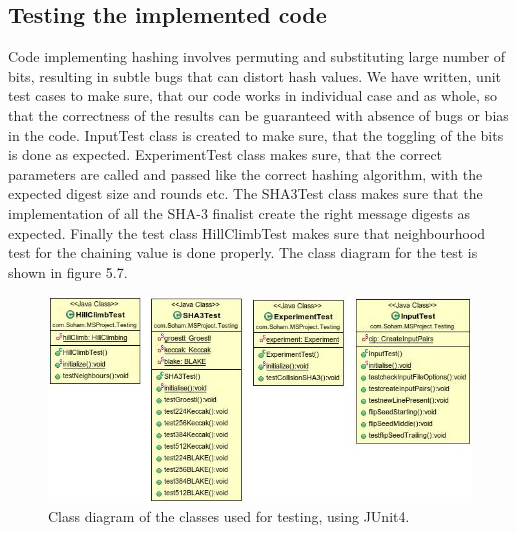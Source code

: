 \subsection{Testing the implemented code}

Code implementing hashing involves permuting and substituting large number of bits, resulting in subtle bugs that
can distort hash values. We have written, unit test cases to make sure, that our code works in individual case 
and as whole, so that the correctness of the results can be guaranteed with absence of bugs
or bias in the code. InputTest class is created to make sure, that the toggling of the bits is done as expected.
ExperimentTest class makes sure, that the correct parameters are called and passed like the correct hashing
algorithm, with the expected digest size and rounds etc. The SHA3Test class makes sure that the implementation of 
all the SHA-3 finalist create the right message digests as expected. Finally the test class HillClimbTest makes
sure that neighbourhood test for the chaining value is done properly. The class diagram for the test is shown in
figure 5.7.

\begin{figure}
  \begin{center}
    \includegraphics[width=6.75in]{testingcode.jpg}
  \end{center}
  \caption{Class diagram of the classes used for testing, using JUnit4.}
  \label{fig:UMLJUnitTestClasses}
\end{figure}
